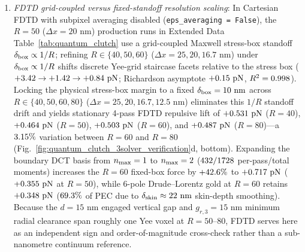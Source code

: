 \documentclass[pdflatex,sn-nature]{sn-jnl}
\DeclareRobustCommand{\roundtwo}[1]{\fpeval{round(#1,2)}}
\DeclareRobustCommand{\roundthree}[1]{\fpeval{round(#1,3)}}
\begin{document}
\begin{enumerate}
    \item \emph{FDTD grid-coupled versus fixed-standoff resolution scaling}: In Cartesian FDTD with subpixel averaging disabled (\texttt{eps\_averaging = False}), the $R=50$ ($\Delta x = 20\text{ nm}$) production runs in Extended Data Table~\ref{tab:quantum_clutch} use a grid-coupled Maxwell stress-box standoff $\delta_{\rm box} \propto 1/R$; refining $R \in \{40, 50, 60\}$ ($\Delta x = 25, 20, 16.7\text{ nm}$) under $\delta_{\rm box} \propto 1/R$ shifts discrete Yee-grid staircase facets relative to the stress box ($+\roundtwo{\CantorNtwoHybridrzMeepRfourzeroFZPn} \to +\roundtwo{\CantorNtwoHybridrzMeepRfivezeroFZPn} \to +\roundtwo{\CantorNtwoHybridrzMeepRsixzeroFZPn}\text{ pN}$; Richardson asymptote $+\roundtwo{\CantorNtwoHybridrzMeepRichardsonFZPn}\text{ pN}$, $R^2 = \roundthree{\NatureMeepRichardsonRtwoFourpass}$). Locking the physical stress-box margin to a fixed $\delta_{\rm box} = 10{}\text{ nm}$ across $R \in \{40, 50, 60, 80\}$ ($\Delta x = 25, 20, 16.7, 12.5\text{ nm}$) eliminates this $1/R$ standoff drift and yields stationary 4-pass FDTD repulsive lift of $+\roundthree{\MeepFixedboxRfourzeroFzPn}\text{ pN}$ ($R=40$), $+\roundthree{\MeepFixedboxRfivezeroFzPn}\text{ pN}$ ($R=50$), $+\roundthree{\MeepFixedboxRsixzeroFzPn}\text{ pN}$ ($R=60$), and $+\roundthree{\MeepFixedboxReightzeroFzPn}\text{ pN}$ ($R=80$)---a $\roundtwo{\MeepFixedboxRsixzeroToReightzeroDriftPct}\%$ variation between $R=60$ and $R=80$ (Fig.~\ref{fig:quantum_clutch_3solver_verification}d, bottom). Expanding the boundary DCT basis from $n_{\rm max}=1$ to $n_{\rm max}=2$ ($432{}/1728{}$ per-pass/total moments) increases the $R=60$ fixed-box force by $+42.6{}\%$ to $+\roundthree{\MeepFixedboxRsixzeroNmaxtwoFzPn}\text{ pN}$ ($+\roundthree{\MeepFixedboxRfivezeroNmaxtwoFzPn}\text{ pN}$ at $R=50$), while 6-pole Drude--Lorentz gold at $R=60$ retains $+\roundthree{\MeepFixedboxRsixzeroGoldFzPn}\text{ pN}$ ($69.3{}\%$ of PEC due to $\delta_{\rm skin} \approx 22\text{ nm}$ skin-depth smoothing). Because the $d=15\text{ nm}$ engaged vertical gap and $g_{r,3}=15\text{ nm}$ minimum radial clearance span roughly one Yee voxel at $R=50\text{--}80$, FDTD serves here as an independent sign and order-of-magnitude cross-check rather than a sub-nanometre continuum reference.
\end{enumerate}
\end{document}
